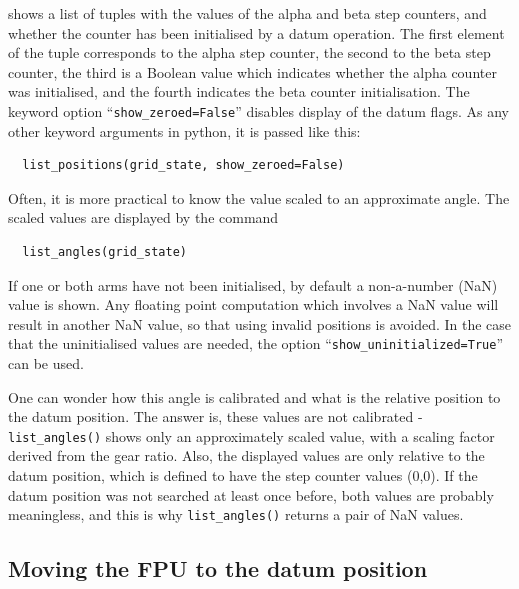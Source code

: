 \documentclass[11pt,a4paper]{scrartcl}
\begin{document}
shows a list of tuples with the values of the alpha and beta step
counters, and whether the counter has been initialised by a datum
operation. The first element of the tuple corresponds to the alpha
step counter, the second to the beta step counter, the third is a
Boolean value which indicates whether the alpha counter was
initialised, and the fourth indicates the beta counter
initialisation. The keyword option ``\texttt{show\_zeroed=False}''
disables display of the datum flags.  As any other keyword arguments
in python, it is passed like this:

\begin{verbatim}
  list_positions(grid_state, show_zeroed=False)
\end{verbatim}



Often, it is more practical to know the value scaled to an approximate
angle. The scaled values are displayed by the command
\begin{verbatim}
  list_angles(grid_state)
\end{verbatim}

If one or both arms have not been initialised, by default a
non-a-number (NaN) value is shown. Any floating point computation
which involves a NaN value will result in another NaN value, so that
using invalid positions is avoided.  In the case that the
uninitialised values are needed, the option
``\texttt{show\_uninitialized=True}'' can be used.


One can wonder how this angle is calibrated and what is the relative
position to the datum position. The answer is, these values are not
calibrated - \texttt{list\_angles()} shows only an approximately
scaled value, with a scaling factor derived from the gear ratio.
Also, the displayed values are only relative to the datum position,
which is defined to have the step counter values (0,0). If the datum
position was not searched at least once before, both values are
probably meaningless, and this is why \texttt{list\_angles()} returns
a pair of NaN values.




\subsection{Moving the FPU to the datum position}
\label{sec:finddatumreference}
\end{document}
